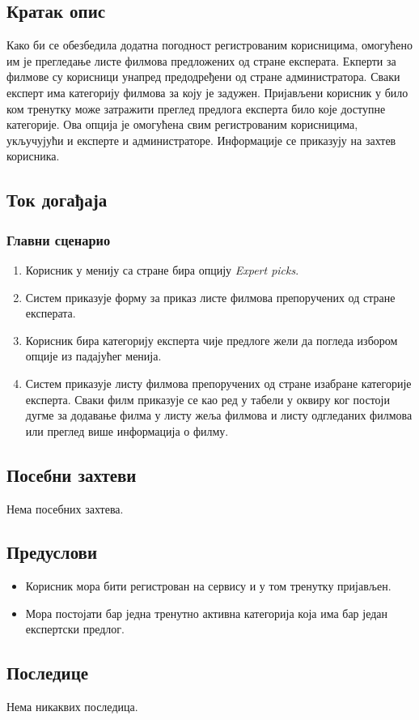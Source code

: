 \subsection{Кратак опис}

Како би се обезбедила додатна погодност регистрованим корисницима, омогућено им је прегледање листе филмова предложених од стране експерата. Екперти за филмове су корисници унапред предодређени од стране администратора. Сваки експерт
има категорију филмова за коју је задужен. Пријављени корисник у било ком тренутку може затражити преглед предлога експерта било које доступне категорије. Ова опција је омогућена свим регистрованим корисницима, укључујући и експерте и администраторе. Информације се приказују на захтев корисника.

\subsection{Ток догађаја}

\subsubsection{Главни сценарио}

\begin{enumerate}
    \item Корисник у менију са стране бира опцију \textit{Expert picks}.
    \item Систем приказује форму за приказ листе филмова препоручених од стране експерата.
    \item Корисник бира категорију експерта чије предлоге жели да погледа избором опције из падајућег менија.
    \item Систем приказује листу филмова препоручених од стране изабране категорије експерта. Сваки филм приказује 
    се као ред у табели у оквиру ког постоји дугме за додавање филма у листу жеља филмова и листу одгледаних филмова 
    или преглед више информација о филму.
\end{enumerate}

\subsection{Посебни захтеви}

Нема посебних захтева.

\subsection{Предуслови}

\begin{itemize}
    \item Корисник мора бити регистрован на сервису и у том тренутку пријављен.
    \item Мора постојати бар једна тренутно активна категорија која има бар један експертски предлог.
\end{itemize}

\subsection{Последице}

Нема никаквих последица.

